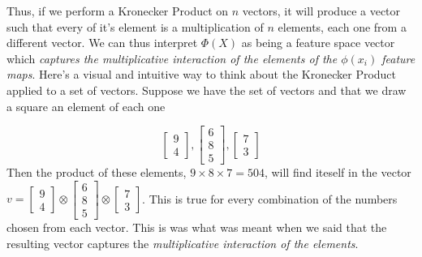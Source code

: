 \documentclass{article}
\theoremstyle{definition}
\theoremstyle{definition}
\begin{document}
Thus, if we perform a Kronecker Product on $n$ vectors, it will produce a vector such that every of it's element is a multiplication of $n$ elements, each one from a different vector. We can thus interpret $\Phi(X)$ as being a feature space vector which \emph{captures the multiplicative interaction of the elements of the $\phi(x_i)$ feature maps}. Here's a visual and intuitive way to think about the Kronecker Product applied to a set of vectors. Suppose we have the set of vectors and that we draw a square an element of each one

\[
    \begin{bmatrix}
        \boxed{9} \\ 4
    \end{bmatrix},
    \begin{bmatrix}
        6 \\ \boxed{8} \\ 5
    \end{bmatrix},
    \begin{bmatrix}
        \boxed{7} \\ 3
    \end{bmatrix}
\]
Then the product of these elements,  $9\times8\times7=504$, will find iteself in the vector $v=
    \begin{bmatrix}
        9 \\ 4
    \end{bmatrix}
    \otimes
    \begin{bmatrix}
        6 \\ 8 \\ 5
    \end{bmatrix}
    \otimes
    \begin{bmatrix}
        7 \\ 3
    \end{bmatrix}
$. This is true for every combination of the numbers chosen from each vector. This is was what was meant when we said that the resulting vector captures the \emph{multiplicative interaction of the elements}.
\end{document}
